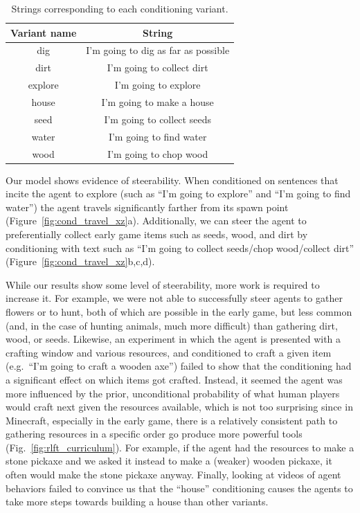 \begin{table}[htbp]
\begin{center}
    \begin{tabular}{|c|c|}
        \hline
        \textbf{Variant name} & \textbf{String} \\
        \hline
        dig & I'm going to dig as far as possible \\
        dirt & I'm going to collect dirt \\
        explore & I'm going to explore \\
        house & I'm going to make a house \\
        seed & I'm going to collect seeds \\
        water & I'm going to find water \\
        wood & I'm going to chop wood \\
        \hline
    \end{tabular}
\end{center}
\caption{Strings corresponding to each conditioning variant.}
\label{tab:cond_strings}
\end{table}

Our model shows evidence of steerability. When conditioned on sentences that incite the agent to explore (such as ``I'm going to explore'' and ``I'm going to find water'') the agent travels significantly farther from its spawn point (Figure~\ref{fig:cond_travel_xz}a). Additionally, we can steer the agent to preferentially collect early game items such as seeds, wood, and dirt by conditioning with text such as ``I'm going to collect seeds/chop wood/collect dirt'' (Figure~\ref{fig:cond_travel_xz}b,c,d).

While our results show some level of steerability, more work is required to increase it. For example, we were not able to successfully steer agents to gather flowers or to hunt, both of which are possible in the early game, but less common (and, in the case of hunting animals, much more difficult) than gathering dirt, wood, or seeds. Likewise, an experiment in which the agent is presented with a crafting window and various resources, and conditioned to craft a given item (e.g.\ ``I'm going to craft a wooden axe'') failed to show that the conditioning had a significant effect on which items got crafted. Instead, it seemed the agent was more influenced by the prior, unconditional probability of what human players would craft next given the resources available, which is not too surprising since in Minecraft, especially in the early game, there is a relatively consistent path to gathering resources in a specific order go produce more powerful tools (Fig.~\ref{fig:rlft_curriculum}). For example, if the agent had the resources to make a stone pickaxe and we asked it instead to make a (weaker) wooden pickaxe, it often would make the stone pickaxe anyway. Finally, looking at videos of agent behaviors failed to convince us that the ``house'' conditioning causes the agents to take more steps towards building a house than other variants. 

